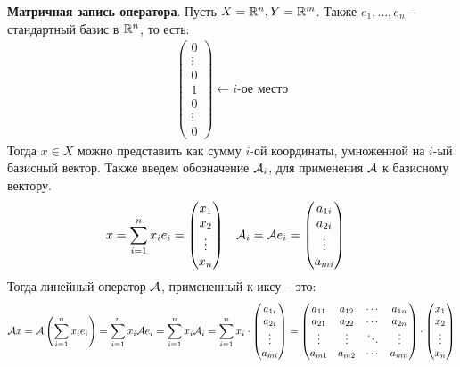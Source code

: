 \textbf{Матричная запись оператора}. Пусть $X = \mathbb{R}^n, Y = \mathbb{R}^m$. Также $e_1, \dots, e_n$ -- стандартный базис в $\mathbb{R}^n$, то есть:
\begin{gather*}
    \begin{pmatrix*}
        0 \\ 
        \vdots \\
        0 \\
        1 \\
        0 \\
        \vdots \\
        0
    \end{pmatrix*} \longleftarrow i\text{-ое место}
\end{gather*}
Тогда $x \in X$ можно представить как сумму $i$-ой координаты, умноженной на $i$-ый базисный вектор. 
Также введем обозначение $\mathcal{A}_i$, для применения $\mathcal{A}$ к базисному вектору. 
\begin{align*}
    x &= \sum\limits_{i=1}^n x_i e_i = \begin{pmatrix*}
        x_1 \\
        x_2 \\
        \vdots \\
        x_n
    \end{pmatrix*} & \A_i &= \A e_i = \begin{pmatrix*}
        a_{1i} \\
        a_{2i} \\
        \vdots \\
        a_{mi}
    \end{pmatrix*}
\end{align*}
Тогда линейный оператор $\mathcal{A}$, примененный к иксу -- это:
\begin{gather*}
    \A x = \A \left( \sum\limits_{i=1}^n x_i e_i \right) = \sum\limits_{i=1}^n x_i \A e_i = \sum\limits_{i=1}^n x_i \A_i = \sum\limits_{i=1}^n x_i \cdot \begin{pmatrix*} 
        a_{1i} \\
        a_{2i} \\
        \vdots \\
        a_{mi}
    \end{pmatrix*} =
    \begin{pmatrix*} 
        a_{11} & a_{12} & \cdots & a_{1n} \\
        a_{21} & a_{22} & \cdots & a_{2n} \\
        \vdots & \vdots & \ddots & \vdots \\
        a_{m1} & a_{m2} & \cdots & a_{mn} 
    \end{pmatrix*} \cdot \begin{pmatrix*}
        x_1 \\
        x_2 \\
        \vdots \\
        x_n
    \end{pmatrix*}
\end{gather*}